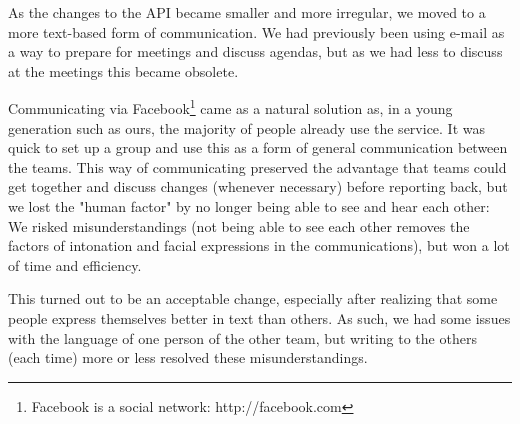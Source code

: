 As the changes to the API became smaller and more irregular, we moved to a more text-based form of communication. We had
previously been using e-mail as a way to prepare for meetings and discuss agendas, but as we had less to discuss at the
meetings this became obsolete.

Communicating via Facebook\footnote{Facebook is a social network: http://facebook.com} came as a natural solution as, in a young generation such as ours, the majority of people
already use the service. It was quick to set up a group and use this as a form of general communication between the teams. This way
of communicating preserved the advantage that teams could get together and discuss changes (whenever necessary) before reporting back,
but we lost the "human factor" by no longer being able to see and hear each other:
We risked misunderstandings (not being able to see each other removes the factors of intonation and facial expressions in the communications),
but won a lot of time and efficiency.

This turned out to be an acceptable change, especially after realizing that some people express
themselves better in text than others. As such, we had some issues with the language of one person of the other team, but writing to the
others (each time) more or less resolved these misunderstandings.
